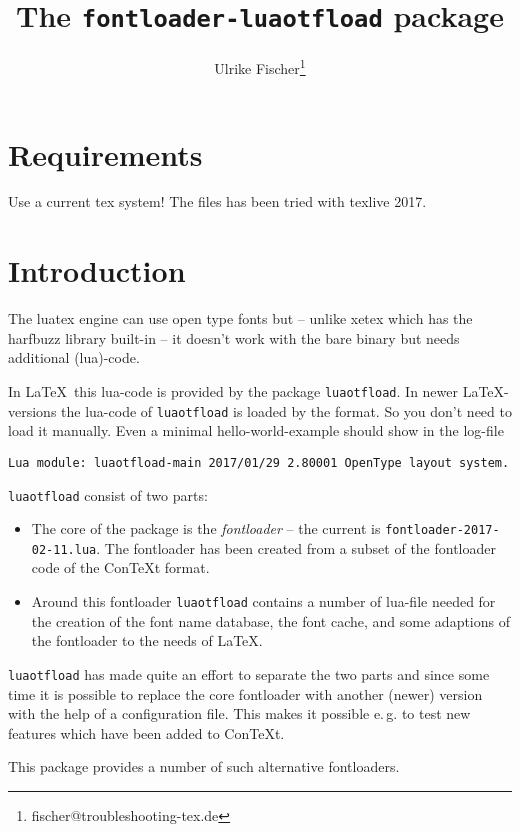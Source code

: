 \documentclass[parskip=half-,egregdoesnotlikesansseriftitles]{scrartcl}
\title{The \texttt{fontloader-luaotfload} package}
\author{Ulrike Fischer\thanks{fischer@troubleshooting-tex.de}}
\newcommand\package[1]{\texttt{#1}}
\begin{document}
\maketitle

\section{Requirements}

Use a current tex system! The files has been tried with texlive 2017.

\section{Introduction}
The luatex engine can use open type fonts but -- unlike xetex which has the harfbuzz library built-in  --  it doesn't work with the bare binary but needs additional (lua)-code.

In \LaTeX\ this lua-code is provided by the package \package{luaotfload}. In newer \LaTeX-versions the lua-code of \package{luaotfload} is loaded by the format. So you don't need to load it manually. Even a minimal hello-world-example should show in the log-file

\verb+Lua module: luaotfload-main 2017/01/29 2.80001 OpenType layout system.+




\package{luaotfload} consist of two parts:

\begin{itemize}
\item The core of the package is the \emph{fontloader} -- the current is \texttt{fontloader-2017-02-11.lua}. The fontloader has been created from a subset of the fontloader code of the Con\TeX{}t format.

\item Around this fontloader \package{luaotfload} contains a number of lua-file needed for the creation of the font name database, the font cache, and some adaptions of the fontloader to the needs of \LaTeX.
\end{itemize}

\package{luaotfload} has made quite an effort to separate the two parts and since some time it is possible to replace the core fontloader with another (newer) version with the help of a configuration file. This makes it possible e.\,g. to test new features which have been added to Con\TeX{}t.

This package provides a number of such alternative fontloaders.
\end{document}
